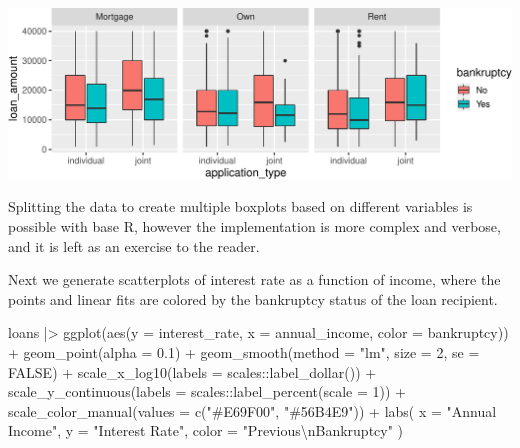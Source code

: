 \documentclass[12pt]{article}
\newenvironment{Shaded}{\begin{snugshade}}{\end{snugshade}}
\newcommand{\AttributeTok}[1]{\textcolor[rgb]{0.77,0.63,0.00}{#1}}
\newcommand{\ConstantTok}[1]{\textcolor[rgb]{0.00,0.00,0.00}{#1}}
\newcommand{\DecValTok}[1]{\textcolor[rgb]{0.00,0.00,0.81}{#1}}
\newcommand{\FloatTok}[1]{\textcolor[rgb]{0.00,0.00,0.81}{#1}}
\newcommand{\FunctionTok}[1]{\textcolor[rgb]{0.00,0.00,0.00}{#1}}
\newcommand{\NormalTok}[1]{#1}
\newcommand{\SpecialCharTok}[1]{\textcolor[rgb]{0.00,0.00,0.00}{#1}}
\newcommand{\StringTok}[1]{\textcolor[rgb]{0.31,0.60,0.02}{#1}}
\begin{document}
\begin{center}\includegraphics[width=1\linewidth]{educators-perspective-tidyverse_files/figure-latex/ggplot_ex2-1} \end{center}

\label{ggplot-ex2} \linespread{2}
\vspace{3mm}\setlength{\parindent}{15pt}

Splitting the data to create multiple boxplots based on different
variables is possible with base R, however the implementation is more
complex and verbose, and it is left as an exercise to the reader.

Next we generate scatterplots of interest rate as a function of income,
where the points and linear fits are colored by the bankruptcy status of
the loan recipient.

\linespread{1}

\begin{Shaded}
\begin{Highlighting}[]
\NormalTok{loans }\SpecialCharTok{|\textgreater{}}
  \FunctionTok{ggplot}\NormalTok{(}\FunctionTok{aes}\NormalTok{(}\AttributeTok{y =}\NormalTok{ interest\_rate, }\AttributeTok{x =}\NormalTok{ annual\_income, }\AttributeTok{color =}\NormalTok{ bankruptcy)) }\SpecialCharTok{+}
  \FunctionTok{geom\_point}\NormalTok{(}\AttributeTok{alpha =} \FloatTok{0.1}\NormalTok{) }\SpecialCharTok{+} 
  \FunctionTok{geom\_smooth}\NormalTok{(}\AttributeTok{method =} \StringTok{"lm"}\NormalTok{, }\AttributeTok{size =} \DecValTok{2}\NormalTok{, }\AttributeTok{se =} \ConstantTok{FALSE}\NormalTok{) }\SpecialCharTok{+} 
  \FunctionTok{scale\_x\_log10}\NormalTok{(}\AttributeTok{labels =}\NormalTok{ scales}\SpecialCharTok{::}\FunctionTok{label\_dollar}\NormalTok{()) }\SpecialCharTok{+}
  \FunctionTok{scale\_y\_continuous}\NormalTok{(}\AttributeTok{labels =}\NormalTok{ scales}\SpecialCharTok{::}\FunctionTok{label\_percent}\NormalTok{(}\AttributeTok{scale =} \DecValTok{1}\NormalTok{)) }\SpecialCharTok{+}
  \FunctionTok{scale\_color\_manual}\NormalTok{(}\AttributeTok{values =} \FunctionTok{c}\NormalTok{(}\StringTok{"\#E69F00"}\NormalTok{, }\StringTok{"\#56B4E9"}\NormalTok{)) }\SpecialCharTok{+}
  \FunctionTok{labs}\NormalTok{(}
    \AttributeTok{x =} \StringTok{"Annual Income"}\NormalTok{, }
    \AttributeTok{y =} \StringTok{"Interest Rate"}\NormalTok{, }
    \AttributeTok{color =} \StringTok{"Previous}\SpecialCharTok{\textbackslash{}n}\StringTok{Bankruptcy"}
\NormalTok{    )}
\end{Highlighting}
\end{Shaded}
\end{document}

